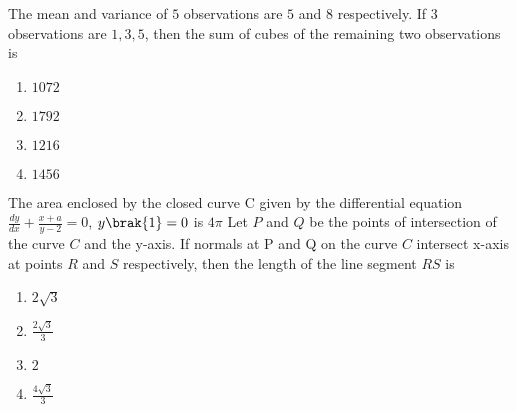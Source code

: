 \item The mean and variance of $5$ observations are $5$ and 
$8$ respectively. If $3$ observations are $1, 3, 5$, then 
the sum of cubes of the remaining two 
observations is
\hfill{}
\begin{enumerate}
    \item $1072$
    \item $1792$
    \item $1216$
    \item $1456$
\end{enumerate}

\item The area enclosed by the closed curve C given by 
the differential equation 
$\frac{dy}{dx}+\frac{x+a}{y-2}=0$, $y\brak{1}=0$ is $4\pi$
 Let $P$ and $Q$ be the points of intersection of the 
curve $C$ and the y-axis. If normals at P and Q on 
the curve $C$ intersect x-axis at points $R$ and $S$ 
respectively, then the length of the line segment 
$RS$ is
\hfill{}
\begin{enumerate}
    \item $2\sqrt{3}$
    \item $\frac{2\sqrt{3}}{3}$
    \item $2$
    \item $\frac{4\sqrt{3}}{3}$
\end{enumerate}

